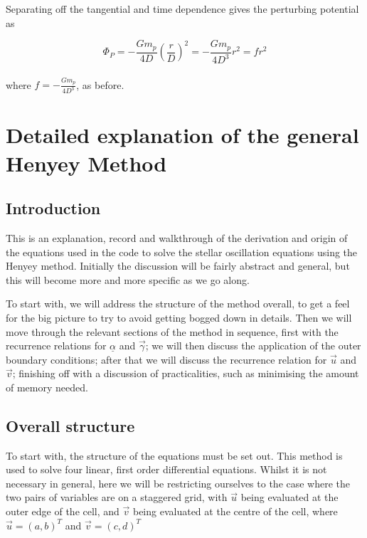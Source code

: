 \documentclass[11pt]{amsart}
\begin{document}
Separating off the tangential and time dependence gives the perturbing potential as

\begin{equation}
\Phi_{P} = - \frac{G m_{p}}{4 D}  \left( \frac{r}{D} \right)^{2} = - \frac{G m_{p}}{4 D^{3}} r^{2} = f r^{2}
\end{equation}
\\
where $f = - \frac{G m_{p}}{4 D^{3}}$, as before.
















\section{Detailed explanation of the general Henyey Method}   \label{ap:Henyey}



\subsection{Introduction}

This is an explanation, record and walkthrough of the derivation and origin of the equations used in the code to solve the stellar oscillation equations using the Henyey method.  Initially the discussion will be fairly abstract and general, but this will become more and more specific as we go along.

To start with, we will address the structure of the method overall, to get a feel for the big picture to try to avoid getting bogged down in details.  Then we will move through the relevant sections of the method in sequence, first with the recurrence relations for $\underline{\alpha}$ and $\vec{\gamma}$; we will then discuss the application of the outer boundary conditions; after that we will discuss the recurrence relation for $\vec{u}$ and $\vec{v}$; finishing off with a discussion of practicalities, such as minimising the amount of memory needed.


\subsection{Overall structure}

To start with, the structure of the equations must be set out.  This method is used to solve four linear, first order differential equations.  Whilst it is not necessary in general, here we will be restricting ourselves to the case where the two pairs of variables are on a staggered grid, with $\vec{u}$ being evaluated at the outer edge of the cell, and $\vec{v}$ being evaluated at the centre of the cell, where $\vec{u} = \left( a, b \right)^{T}$ and $\vec{v} = \left( c, d \right)^{T}$
\end{document}
